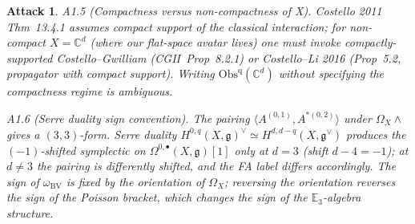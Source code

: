 \documentclass[11pt]{article}
\newtheorem*{attack}{Attack}
\theoremstyle{definition}
\providecommand{\CC}{\mathbb{C}}
\providecommand{\fg}{\mathfrak{g}}
\providecommand{\Obs}{\mathrm{Obs}}
\providecommand{\BV}{\mathrm{BV}}
\begin{document}
\begin{attack}
\emph{A1.5 (Compactness versus non-compactness of X).} Costello 2011
Thm~13.4.1 assumes compact support of the classical interaction; for
non-compact $X = \CC^d$ (where our flat-space avatar lives) one must
invoke compactly-supported Costello--Gwilliam (CGII~Prop~8.2.1) or
Costello--Li 2016 (Prop~5.2, propagator with compact support). Writing
$\Obs^{\mathrm{q}}(\CC^d)$ without specifying the compactness regime
is ambiguous.

\emph{A1.6 (Serre duality sign convention).} The pairing
$\langle A^{(0,1)}, A^{*(0,2)}\rangle$ under $\Omega_X\wedge$ gives a
$(3,3)$-form. Serre duality
$H^{0,q}(X,\fg)^\vee \simeq H^{d,d-q}(X,\fg^\vee)$ produces the
$(-1)$-shifted symplectic on $\Omega^{0,\bullet}(X,\fg)[1]$ only at
$d=3$ (shift $d-4=-1$); at $d\neq 3$ the pairing is differently
shifted, and the FA label differs accordingly. The \emph{sign} of
$\omega_{\BV}$ is fixed by the orientation of $\Omega_X$; reversing the
orientation reverses the sign of the Poisson bracket, which changes
the sign of the $\mathbb{E}_3$-algebra structure.
\end{attack}
\end{document}
